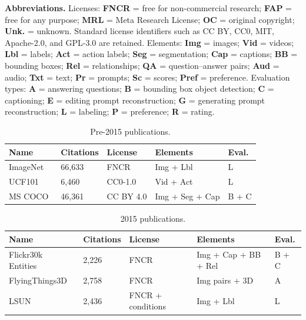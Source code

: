 ﻿\documentclass[11pt,a4paper]{article}
\begin{document}
\noindent\textbf{Abbreviations.}
Licenses: \textbf{FNCR} = free for non-commercial research; \textbf{FAP} = free for any purpose; \textbf{MRL} = Meta Research License; \textbf{OC} = original copyright; \textbf{Unk.} = unknown. Standard license identifiers such as CC BY, CC0, MIT, Apache-2.0, and GPL-3.0 are retained.
Elements: \textbf{Img} = images; \textbf{Vid} = videos; \textbf{Lbl} = labels; \textbf{Act} = action labels; \textbf{Seg} = segmentation; \textbf{Cap} = captions; \textbf{BB} = bounding boxes; \textbf{Rel} = relationships; \textbf{QA} = question--answer pairs; \textbf{Aud} = audio; \textbf{Txt} = text; \textbf{Pr} = prompts; \textbf{Sc} = scores; \textbf{Pref} = preference.
Evaluation types: \textbf{A} = answering questions; \textbf{B} = bounding box object detection; \textbf{C} = captioning; \textbf{E} = editing prompt reconstruction; \textbf{G} = generating prompt reconstruction; \textbf{L} = labeling; \textbf{P} = preference; \textbf{R} = rating.


\begin{table}[H]
\centering
\caption{Pre-2015 publications.}
\label{tab:datasets}
\begin{tabular}{p{2.5cm}p{1.65cm}p{3.05cm}p{3.2cm}p{2.15cm}}
\hline
\textbf{Name} & \textbf{Citations} & \textbf{License} & \textbf{Elements} & \textbf{Eval.}\\
\hline
ImageNet~\cite{deng2009imagenet} & 66,633 & FNCR & Img + Lbl & L\\
\hline
UCF101~\cite{soomro2012ucf101} & 6,460 & CC0-1.0 & Vid + Act & L\\
\hline
MS COCO~\cite{lin2014coco} & 46,361 & CC BY 4.0 & Img + Seg + Cap & B + C\\
\hline

\end{tabular}
\end{table}

\begin{table}[H]
\centering
\caption{2015 publications.}
\begin{tabular}{p{2.5cm}p{1.65cm}p{3.05cm}p{3.2cm}p{2.15cm}}
\hline
\textbf{Name} & \textbf{Citations} & \textbf{License} & \textbf{Elements} & \textbf{Eval.}\\
\hline
Flickr30k Entities~\cite{plummer2015flickr30k} & 2,226 & FNCR & Img + Cap + BB + Rel & B + C\\
\hline
FlyingThings3D~\cite{mayer2016large} & 2,758 & FNCR & Img pairs + 3D & A\\
\hline
LSUN~\cite{yu2015lsun} & 2,436 & FNCR + conditions & Img + Lbl & L\\
\hline

\end{tabular}
\end{table}
\end{document}
